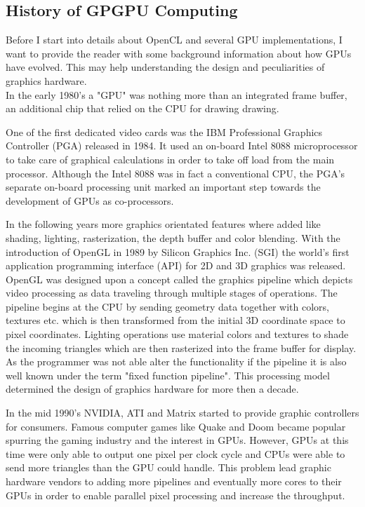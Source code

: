 \subsection{History of GPGPU Computing \cite{gpu_history}} 
Before I start into details about OpenCL and several GPU implementations, I want to provide the reader with some background information about how GPUs have evolved. This may help understanding the design and peculiarities of graphics hardware.
\\
In the early 1980's a "GPU" was nothing more than an integrated frame buffer, an additional chip that relied on the CPU for drawing drawing.

One of the first dedicated video cards was the IBM Professional Graphics Controller (PGA) released in 1984. It used an on-board Intel 8088 microprocessor to take care of graphical calculations in order to take off load from the main processor. Although the Intel 8088 was in fact a conventional CPU, the PGA's separate on-board processing unit marked an important step towards the development of GPUs as co-processors.

In the following years more graphics orientated features where added like shading, lighting, rasterization, the depth buffer and color blending. With the introduction of OpenGL in 1989 by Silicon Graphics Inc. (SGI) the world's first application programming interface (API) for 2D and 3D graphics was released. OpenGL was designed upon a concept called the graphics pipeline which depicts video processing as data traveling through multiple stages of operations. The pipeline begins at the CPU by sending geometry data together with colors, textures etc. which is then transformed from the initial 3D coordinate space to pixel coordinates. Lighting operations use material colors and textures to shade the incoming triangles which are then rasterized into the frame buffer for display. As the programmer was not able alter the functionality if the pipeline it is also well known under the term "fixed function pipeline". This processing model determined the design of graphics hardware for more then a decade.

In the mid 1990's NVIDIA, ATI and Matrix started to provide graphic controllers for consumers. Famous computer games like Quake and Doom became popular spurring the gaming industry and the interest in GPUs. However, GPUs at this time were only able to output one pixel per clock cycle and CPUs were able to send more triangles than the GPU could handle. This problem lead graphic hardware vendors to adding more pipelines and eventually more cores to their GPUs in order to enable parallel pixel processing and increase the throughput.

